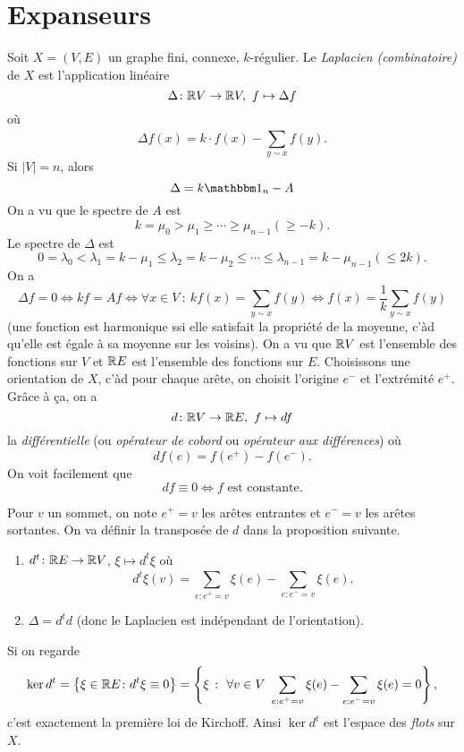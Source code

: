 \section{Expanseurs}
\label{sec:expanseurs}

Soit $X = (V, E)$ un graphe fini, connexe, $k$-régulier. Le \emph{Laplacien (combinatoire)}
de $X$ est l'application linéaire 
\[ \Delta \colon \mathbb{R} V \to \mathbb{R} V, \ f \mapsto \Delta f \]
où 
\[ \Delta f(x) = k \cdot f(x) - \sum_{y \sim x}^{}f(y). \]
Si $|V| = n$, alors 
\[ \Delta = k \un_n - A \]
On a vu que le spectre de $A$ est 
\[ k = \mu_0 > \mu_1 \geq \cdots \geq \mu_{n-1} (\geq -k). \]
Le spectre de $\Delta$ est 
\[ 0 = \lambda_0 < \lambda_1 = k - \mu_1 \leq \lambda_2 = k - \mu_2 \leq \cdots \leq \lambda_{n-1} = k -
  \mu_{n-1} (\leq 2k). \]
On a 
\[ \Delta f = 0 \iff kf = Af \iff \forall x \in V\ \colon \ kf(x) = \sum_{y \sim x}^{}f(y) \iff f(x) =
  \frac{1}{k} \sum_{y \sim x}^{} f(y) \]
(une fonction est harmonique ssi elle satisfait la propriété de la moyenne, c'àd qu'elle est égale à sa
moyenne sur les voisins). On a vu que $\mathbb{R} V$ est l'ensemble des fonctions sur $V$ et $\mathbb{R} E$ est l'ensemble des
fonctions sur $E$. Choisissons une orientation de $X$, c'àd pour chaque arête, on choisit l'origine $e^-$ et
l'extrémité $e^+$. Grâce à ça, on a 
\[ d\colon \mathbb{R} V \to \mathbb{R} E,\ f \mapsto df \]
la \emph{différentielle} (ou \emph{opérateur de cobord} ou
\emph{opérateur aux différences}) où 
\[ d f(e) = f(e^+) - f(e^-). \]
On voit facilement que 
\[ df \equiv 0 \iff f \text{ est constante.} \]

Pour $v$ un sommet, on note $e^+ = v$ les arêtes entrantes et $e^- = v$ les arêtes sortantes. On va définir la
transposée de $d$ dans la proposition suivante.

\begin{prop}
  \begin{enumerate}
  \item $d^t \colon \mathbb{R} E \to \mathbb{R} V$, $\xi \mapsto d^t \xi$ où
    \[d^t \xi (v) = \sum_{e: e^+ = v}^{} \xi(e) - \sum_{e: e^- = v}^{} \xi(e).\]
    
  \item $\Delta = d^td$ (donc le Laplacien est indépendant de l'orientation).
  \end{enumerate}
\end{prop}


\begin{rem}
  Si on regarde \[\ker d^t = \left\{ \xi \in \mathbb{R} E \colon d^t \xi \equiv 0 \right\} = \left\{ \xi\ \colon\
    \forall v \in V\ \sum_{e: e^+ = v}^{}\xi(e) - \sum_{e: e^- = v}^{}\xi(e) = 0 \right\},\] c'est exactement
  la \index{première loi de Kirchoff}première loi de Kirchoff. Ainsi $\ker d^t$ est l'espace des
  \emph{\index{flots}flots} sur $X$.
\end{rem}

